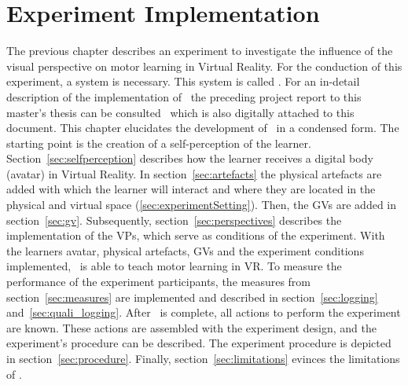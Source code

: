 \chapter{Experiment Implementation}
\label{chapter:system}
The previous chapter describes an experiment to investigate the influence of the visual perspective on motor learning in Virtual Reality. For the conduction of this experiment, a system is necessary. This system is called \exgo. For an in-detail description of the implementation of \exgo\ the preceding project report to this master's thesis can be consulted~\cite{projectReport} which is also digitally attached to this document. This chapter elucidates the development of \exgo\ in a condensed form. The starting point is the creation of a self-perception of the learner. 
Section~\ref{sec:selfperception} describes how the learner receives a digital body (avatar) in Virtual Reality.
In section~\ref{sec:artefacts} the physical artefacts are added with which the learner will interact and where they are located in the physical and virtual space (\ref{sec:experimentSetting}). Then, the GVs are added in section~\ref{sec:gv}. Subsequently, section~\ref{sec:perspectives} describes the implementation of the VPs, which serve as conditions of the experiment. With the learners avatar, physical artefacts, GVs and the experiment conditions implemented, \exgo\ is able to teach motor learning in VR. To measure the performance of the experiment participants, the measures from section~\ref{sec:measures} are implemented and described in section~\ref{sec:logging} and~\ref{sec:quali_logging}. After \exgo\ is complete, all actions to perform the experiment are known. These actions are assembled with the experiment design, and the experiment's procedure can be described. The experiment procedure is depicted in section~\ref{sec:procedure}.
Finally, section~\ref{sec:limitations} evinces the limitations of \exgo.


